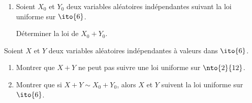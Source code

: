 \begin{enonce}
\begin{exercise}[ID={RMS135 E1332},subtitle={Centrale PSI 2024},tags={oraux},difficulty={}]
  \begin{enumerate}
    \item 
  Soient $X_0$ et $Y_0$ deux variables aléatoires indépendantes suivant la loi uniforme sur $\ito{6}$.

      Déterminer la loi de $X_0 + Y_0$.
\end{enumerate}
Soient $X$ et $Y$ deux variables aléatoires indépendantes à valeurs dans $\ito{6}$.
  \begin{enumerate}[resume]
    \item Montrer que $X+Y$ ne peut pas suivre une loi uniforme sur $\nto{2}{12}$.

    \item Montrer que si $X + Y \sim X_0 + Y_0$, alors $X$ et $Y$ suivent la loi uniforme sur $\ito{6}$.
\end{enumerate}
\end{exercise}
\begin{solution}
\end{solution}
\end{enonce}
